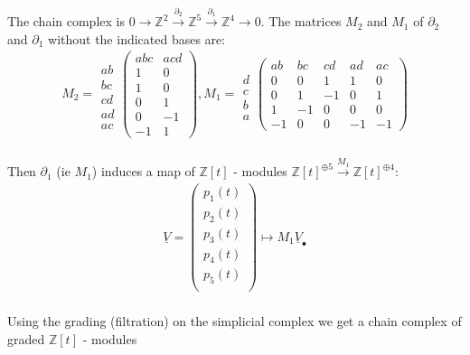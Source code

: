 \documentclass[11pt,a4paper]{report}
\begin{document}
              The chain complex is $0 \rightarrow \mathbb{Z}^2 \xrightarrow{\partial_2} \mathbb{Z}^5 \xrightarrow{\partial_1} \mathbb{Z}^4 \rightarrow 0$. The matrices $M_2$ and $M_1$ of $\partial_2$ and $\partial_1$ without the indicated bases are:
              \begin{align*}
                M_2 = \begin{array}{c}\\ab\\bc\\cd\\ad\\ac\end{array}\left(\begin{array}{cc}abc&acd\\1&0\\1&0\\0&1\\0&-1\\-1&1\end{array}\right), M_1 = \begin{array}{c}\\d\\c\\b\\a\end{array}\left(\begin{array}{ccccc}ab&bc&cd&ad&ac\\0&0&1&1&0\\0&1&-1&0&1\\1&-1&0&0&0\\-1&0&0&-1&-1\end{array}\right)
              \end{align*}
              \\
              Then $\partial_1$ (ie $M_1$) induces a map of $\mathbb{Z}[t]$ - modules $\mathbb{Z}[t]^{\oplus5} \xrightarrow{M_1} \mathbb{Z}[t]^{\oplus4}$:
              \begin{align*}
                \underline{V} = \left(\begin{array}{c}p_1(t)\\p_2(t)\\p_3(t)\\p_4(t)\\p_5(t)\\\end{array}\right) \mapsto M_1 \underline{V}_\bullet
              \end{align*}
              \\
              Using the grading (filtration) on the simplicial complex we get a chain complex of graded $\mathbb{Z}[t]$ - modules\\
\end{document}
